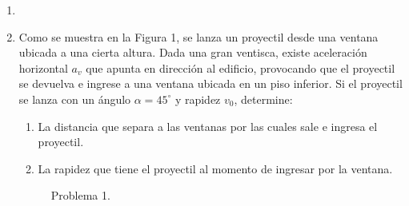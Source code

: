 \documentclass[letterpaper,11pt]{article}
\begin{document}
\vspace{-1cm}
\begin{enumerate}\setlength{\itemsep}{0.4cm}


\item[]

\item 
\begin{multicols}{2}
Como se muestra en la Figura 1, se lanza un proyectil desde una ventana ubicada a una cierta altura. Dada una gran ventisca, existe aceleración horizontal $a_v$ que apunta en dirección al edificio, provocando que el proyectil se devuelva e ingrese a una ventana ubicada en un piso inferior. Si el proyectil se lanza con un ángulo $\alpha=45^{\circ}$ y rapidez $v_0$, determine:

\begin{enumerate}
    \item La distancia que separa a las ventanas por las cuales sale e ingresa el proyectil.
    
    \item La rapidez que tiene el proyectil al momento de ingresar por la ventana.
    
\end{enumerate}

\columnbreak

\begin{figure}[H]
    \centering
    
    \caption{Problema 1.}
\end{figure}

\end{multicols}


%   

\end{enumerate}
\end{document}
